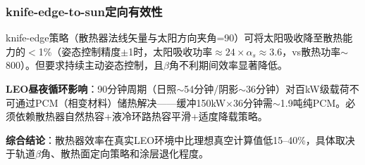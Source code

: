 \subsubsection{knife-edge-to-sun定向有效性}

knife-edge策略（散热器法线矢量与太阳方向夹角=90\unitC{}）可将太阳吸收降至散热能力的$<$1\%（姿态控制精度$\pm$1\unitC{}时，太阳吸收功率$\approx24\times\alpha_s\approx3.6$\unitWpm{}，vs散热功率$\sim$800\unitWpm{}）。但要求持续主动姿态控制，且$\beta$角不利期间效率显著降低。

\textbf{LEO昼夜循环影响}：90分钟周期（日照$\sim$54分钟/阴影$\sim$36分钟）对百kW级载荷不可通过PCM（相变材料）储热解决——缓冲150kW$\times$36分钟需$\sim$1.9吨纯PCM\cite{ijisrt2025pcm}。必须依赖散热器自然热容+液冷环路热容平滑+适度降载策略。

\textbf{综合结论}：散热器效率在真实LEO环境中比理想真空计算值低15--40\%，具体取决于轨道$\beta$角、散热面定向策略和涂层退化程度。

